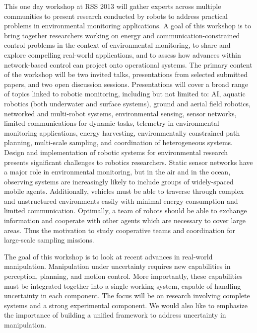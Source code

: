\begin{spacing}{1.0}
{
This one day workshop at RSS 2013 will gather experts across multiple communities to present research conducted by robots to address practical problems in environmental monitoring applications. A goal of this workshop is to bring together researchers working on energy and communication-constrained control problems in the context of environmental monitoring, to share and explore compelling real-world applications, and to assess how advances within network-based control can project onto operational systems. The primary content of the workshop will be two invited talks, presentations from selected submitted papers, and two open discussion sessions. Presentations will cover a broad range of topics linked to robotic monitoring, including but not limited to: AI, aquatic robotics (both underwater and surface systems), ground and aerial field robotics, networked and multi-robot systems, environmental sensing, sensor networks, limited communications for dynamic tasks, telemetry in environmental monitoring 
applications, energy harvesting, environmentally constrained path planning, multi-scale sampling, and coordination of heterogeneous systems. Design and implementation of robotic systems for environmental research presents significant challenges to robotics researchers. Static sensor networks have a major role in environmental monitoring, but in the air and in the ocean, observing systems are increasingly likely to include groups of widely-spaced mobile agents. Additionally, vehicles must be able to traverse through complex and unstructured environments easily with minimal energy consumption and limited communication. Optimally, a team of robots should be able to exchange information and cooperate with other agents which are necessary to cover large areas. Thus the motivation to study cooperative teams and coordination for large-scale sampling missions.
}


{
The goal of this workshop is to look at recent advances in real-world manipulation. Manipulation under uncertainty requires new capabilities in perception, planning, and motion control. More importantly, these capabilities must be integrated together into a single working system, capable of handling uncertainty in each component. The focus will be on research involving complete systems and a strong experimental component. We would also like to emphasize the importance of building a unified framework to address uncertainty in manipulation. 
}



\end{spacing}

